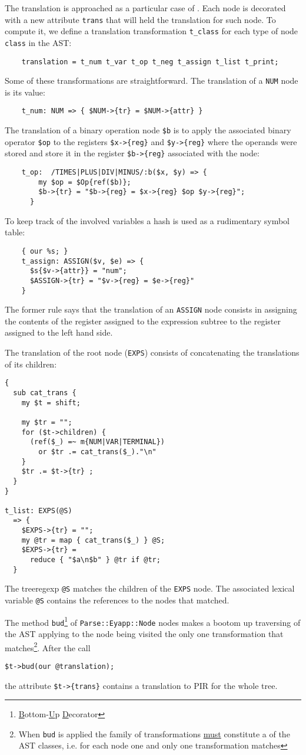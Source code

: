 The translation is approached as a particular case of 
. Each node is decorated with a new
attribute \verb|trans|  that will held 
the translation for such node.
To compute it, we define  a translation transformation
\verb|t_class| for each type of node \verb|class| in the AST:
\begin{verbatim}
    translation = t_num t_var t_op t_neg t_assign t_list t_print;
\end{verbatim}

Some of these transformations are straightforward. 
The translation of a \verb|NUM| node is its value:
\begin{verbatim}
    t_num: NUM => { $NUM->{tr} = $NUM->{attr} }
\end{verbatim}
The translation of a binary operation node \verb|$b|
is to apply the associated
binary operator \verb|$op| to the registers \verb|$x->{reg}| 
and \verb|$y->{reg}| where
the operands were stored and store it in the register
\verb|$b->{reg}| associated with the node:
\begin{verbatim}
    t_op:  /TIMES|PLUS|DIV|MINUS/:b($x, $y) => {
        my $op = $Op{ref($b)};
        $b->{tr} = "$b->{reg} = $x->{reg} $op $y->{reg}";
      }
\end{verbatim}
To keep track of the involved variables
a hash is used as a rudimentary symbol table:
\begin{verbatim}
    { our %s; }
    t_assign: ASSIGN($v, $e) => {
      $s{$v->{attr}} = "num";
      $ASSIGN->{tr} = "$v->{reg} = $e->{reg}"
    }
\end{verbatim}
The former rule says that the translation of an
\verb|ASSIGN| node consists in assigning the contents
of the register assigned to the expression subtree 
to the register assigned to the left hand side.

The translation of the root node (\verb|EXPS|)
consists of concatenating the translations
of its children:
\begin{verbatim}
{
  sub cat_trans {
    my $t = shift;

    my $tr = "";
    for ($t->children) {
      (ref($_) =~ m{NUM|VAR|TERMINAL})
        or $tr .= cat_trans($_)."\n"
    }
    $tr .= $t->{tr} ;
  }
}

t_list: EXPS(@S)
  => {
    $EXPS->{tr} = "";
    my @tr = map { cat_trans($_) } @S;
    $EXPS->{tr} =
      reduce { "$a\n$b" } @tr if @tr;
  }
\end{verbatim}
The treeregexp \verb|@S| matches the children
of the \verb|EXPS| node. The associated lexical variable \verb|@S| 
contains the references to the nodes that 
matched.

The method \verb|bud|\footnote{\underline{B}ottom-\underline{U}p \underline{D}ecorator}
of \verb|Parse::Eyapp::Node| nodes makes a bootom up traversing
of the AST applying to the node being visited the only one transformation that 
matches\footnote{When {\tt bud} is applied the family of transformations \underline{must} constitute
a  of the AST classes, i.e. for each node one and only one
transformation matches}.
After the call 
\begin{verbatim}
$t->bud(our @translation);
\end{verbatim}
the attribute \verb|$t->{trans}| contains 
a translation to PIR for the whole tree.
